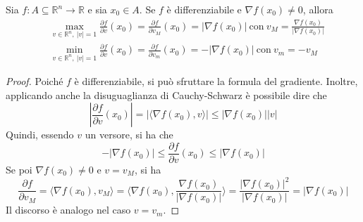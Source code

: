 \begin{proposition} \label{Prop: Interpretazione geometrica del gradiente}
    Sia $f: A \subseteq \mathbb{R}^n \to \mathbb{R}$ e sia $x_0 \in A$. Se $f$ è differenziabile e $\nabla f(x_0) \neq 0$, allora
    \begin{equation}
        \begin{aligned}
            &\max_{v \in \mathbb{R}^n,\ |v|=1}{\frac{\partial f}{\partial v}{(x_0)}}=\frac{\partial f}{\partial v_M}(x_0)=|\nabla f(x_0)|\ \text{con}\ v_M= \frac{\nabla f(x_0)}{|\nabla f(x_0)|}\\
            &\min_{v \in \mathbb{R}^n,\ |v|=1}{\frac{\partial f}{\partial v}{(x_0)}}=\frac{\partial f}{\partial v_m}(x_0)=-|\nabla f(x_0)|\ \text{con}\ v_m= -v_M
        \end{aligned}
    \end{equation}
    \begin{proof}
        Poiché $f$ è differenziabile, si può sfruttare la formula del gradiente. Inoltre, applicando anche la disuguaglianza di Cauchy-Schwarz è possibile dire che
       \begin{equation}
        \left|\frac{\partial f}{\partial v}(x_0)\right|= \left|\langle \nabla f(x_0), v\rangle\right| \leq \left|\nabla f(x_0)\right| \left|v\right|
       \end{equation}
       Quindi, essendo $v$ un versore, si ha che 
       \begin{equation}
        - \left|\nabla f(x_0)\right| \leq \frac{\partial f}{\partial v}(x_0) \leq \left|\nabla f(x_0)\right|
       \end{equation}
       Se poi $\nabla f(x_0) \neq 0$ e $v=v_M$, si ha
       \begin{equation}
        \frac{\partial f }{\partial v_M}= \langle \nabla f(x_0), v_M\rangle = \langle \nabla f(x_0), \frac{\nabla f (x_0)}{|\nabla f(x_0)|}\rangle=\frac{|\nabla f(x_0)|^2}{|\nabla f(x_0)|}=|\nabla f(x_0)|
       \end{equation}
       Il discorso è analogo nel caso $v=v_m$.
    \end{proof}
\end{proposition}
